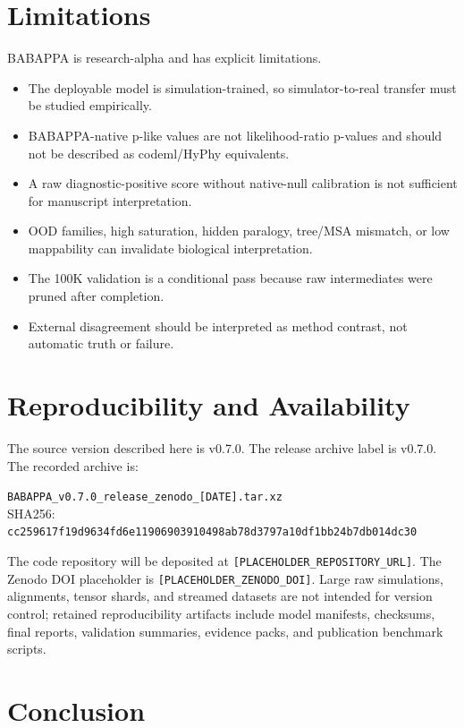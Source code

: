 \documentclass[11pt,a4paper]{article}
\newcommand{\ProjectVersion}{v0.7.0}
\newcommand{\ReleaseArchiveLabel}{v0.7.0}
\newcommand{\RepoURL}{[PLACEHOLDER\_REPOSITORY\_URL]}
\newcommand{\ZenodoDOI}{[PLACEHOLDER\_ZENODO\_DOI]}
\newcommand{\ArchiveName}{\texttt{BABAPPA\_v0.7.0\_release\_zenodo\_[DATE].tar.xz}}
\newcommand{\ArchiveChecksum}{\texttt{cc259617f19d9634fd6e11906903910498ab78d3797a10df1bb24b7db014dc30}}
\begin{document}
\section{Limitations}

BABAPPA is research-alpha and has explicit limitations.

\begin{itemize}[leftmargin=*]
  \item The deployable model is simulation-trained, so simulator-to-real transfer must be studied empirically.
  \item BABAPPA-native p-like values are not likelihood-ratio p-values and should not be described as codeml/HyPhy equivalents.
  \item A raw diagnostic-positive score without native-null calibration is not sufficient for manuscript interpretation.
  \item OOD families, high saturation, hidden paralogy, tree/MSA mismatch, or low mappability can invalidate biological interpretation.
  \item The 100K validation is a conditional pass because raw intermediates were pruned after completion.
  \item External disagreement should be interpreted as method contrast, not automatic truth or failure.
\end{itemize}

\section{Reproducibility and Availability}

The source version described here is \ProjectVersion{}. The release archive label is \ReleaseArchiveLabel{}. The recorded archive is:

\begin{center}
\small\ArchiveName{}\\
\small SHA256: \ArchiveChecksum{}
\end{center}

The code repository will be deposited at \texttt{\RepoURL}. The Zenodo DOI placeholder is \texttt{\ZenodoDOI}. Large raw simulations, alignments, tensor shards, and streamed datasets are not intended for version control; retained reproducibility artifacts include model manifests, checksums, final reports, validation summaries, evidence packs, and publication benchmark scripts.

\section{Conclusion}
\end{document}
